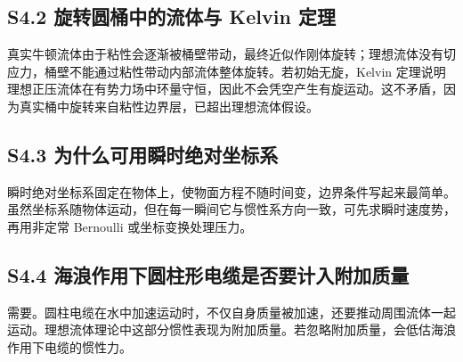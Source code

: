 \documentclass[UTF8,zihao=-4]{ctexart}
\begin{document}
\subsection*{S4.2 旋转圆桶中的流体与 Kelvin 定理}

真实牛顿流体由于粘性会逐渐被桶壁带动，最终近似作刚体旋转；理想流体没有切应力，桶壁不能通过粘性带动内部流体整体旋转。若初始无旋，Kelvin 定理说明理想正压流体在有势力场中环量守恒，因此不会凭空产生有旋运动。这不矛盾，因为真实桶中旋转来自粘性边界层，已超出理想流体假设。

\subsection*{S4.3 为什么可用瞬时绝对坐标系}

瞬时绝对坐标系固定在物体上，使物面方程不随时间变，边界条件写起来最简单。虽然坐标系随物体运动，但在每一瞬间它与惯性系方向一致，可先求瞬时速度势，再用非定常 Bernoulli 或坐标变换处理压力。

\subsection*{S4.4 海浪作用下圆柱形电缆是否要计入附加质量}

需要。圆柱电缆在水中加速运动时，不仅自身质量被加速，还要推动周围流体一起运动。理想流体理论中这部分惯性表现为附加质量。若忽略附加质量，会低估海浪作用下电缆的惯性力。
\end{document}

